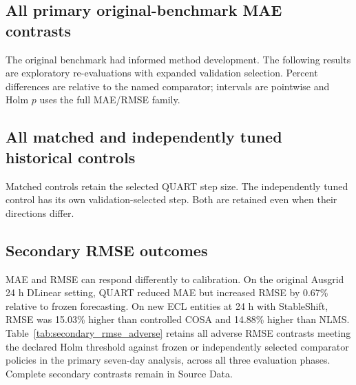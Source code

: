 \documentclass[11pt,a4paper]{article}
\begin{document}
\begin{table}[htbp]
\centering\small
\caption{Expanded-study absolute MAE on all original settings, pooling five seeds. Units are MW (EIA), kW (ECL) and kWh per hourly interval (Ausgrid). History denotes independently selected historical-feedback clipping.}

\end{table}
\subsection{All primary original-benchmark MAE contrasts}
The original benchmark had informed method development. The following results are exploratory re-evaluations with expanded validation selection. Percent differences are relative to the named comparator; intervals are pointwise and Holm $p$ uses the full MAE/RMSE family.
{\footnotesize}
\subsection{All matched and independently tuned historical controls}
Matched controls retain the selected QUART step size. The independently tuned control has its own validation-selected step. Both are retained even when their directions differ.
{\footnotesize}
{\footnotesize}

\subsection{Secondary RMSE outcomes}
MAE and RMSE can respond differently to calibration. On the original Ausgrid 24 h DLinear setting, QUART reduced MAE but increased RMSE by 0.67\% relative to frozen forecasting. On new ECL entities at 24 h with StableShift, RMSE was 15.03\% higher than controlled COSA and 14.88\% higher than NLMS. Table~\ref{tab:secondary_rmse_adverse} retains all adverse RMSE contrasts meeting the declared Holm threshold against frozen or independently selected comparator policies in the primary seven-day analysis, across all three evaluation phases. Complete secondary contrasts remain in Source Data.

\begin{table}[htbp]
\centering\footnotesize
\caption{Adverse secondary RMSE contrasts in the primary seven-day analysis. Positive differences indicate higher QUART RMSE. Intervals are pointwise paired 95\% intervals from the existing 5,000 seed/calendar-block draws. Holm adjustment uses each contrast's declared MAE/RMSE family: 72 tests for the benchmark primary comparison, 24 for benchmark historical clipping and 48 for new-entity primary comparisons. Comparator configurations and the budget are unchanged.}
\label{tab:secondary_rmse_adverse}

\end{table}
\FloatBarrier
\end{document}
